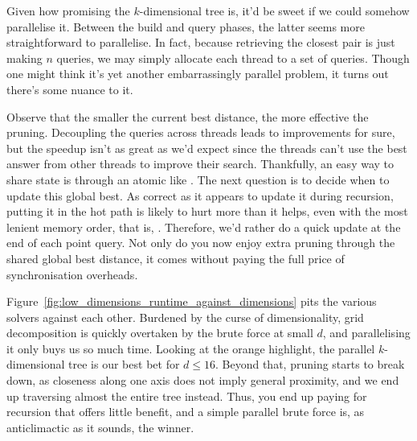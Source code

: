 \begin{aside}
    Given how promising the $k$-dimensional tree is, it'd be sweet if we could somehow
    parallelise it. Between the build and query phases, the latter seems more straightforward
    to parallelise. In fact, because retrieving the closest pair is just making $n$
    queries, we may simply allocate each thread to a set of queries. Though one might
    think it's yet another embarrassingly parallel problem, it turns out there's some nuance
    to it.

    Observe that the smaller the current best distance, the more effective the pruning.
    Decoupling the queries across threads leads to improvements for sure, but the speedup
    isn't as great as we'd expect since the threads can't use the best answer from other
    threads to improve their search. Thankfully, an easy way to share state is through an
    atomic like . The next question is to decide when
    to update this global best. As correct as it appears to update it during recursion,
    putting it in the hot path is likely to hurt more than it helps, even with the
    most lenient memory order, that is, . Therefore,
    we'd rather do a quick update at the end of each point query. Not only do you
    now enjoy extra pruning through the shared global best distance, it comes without
    paying the full price of synchronisation overheads.
\end{aside}

Figure~\ref{fig:low_dimensions_runtime_against_dimensions} pits the various solvers against
each other. Burdened by the curse of dimensionality, grid decomposition is quickly overtaken
by the brute force at small $d$, and parallelising it only buys us so much time. Looking
at the orange highlight, the parallel $k$-dimensional tree is our best bet for $d \leq 16$.
Beyond that, pruning starts to break down, as closeness along one axis does not imply
general proximity, and we end up traversing almost the entire tree instead. Thus, you end
up paying for recursion that offers little benefit, and a simple parallel brute force
is, as anticlimactic as it sounds, the winner.

